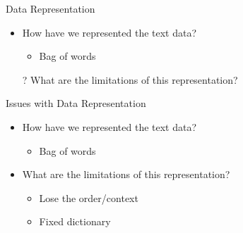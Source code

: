 \documentclass[aspectratio=169]{beamer}
\begin{document}
\begin{frame}{Data Representation}

\begin{itemize}
	\item How have we represented the text data?
	\begin{itemize}
		\item Bag of words
	\end{itemize}
	\item[?] What are the limitations of this representation?
\end{itemize}
\end{frame}
\begin{frame}{Issues with Data Representation}

\begin{itemize}
	\item How have we represented the text data?
	\begin{itemize}
		\item Bag of words
	\end{itemize}
	\item What are the limitations of this representation?
	\begin{itemize}
		\item Lose the order/context
		\item Fixed dictionary
	\end{itemize}
\end{itemize}
\end{frame}
\end{document}

